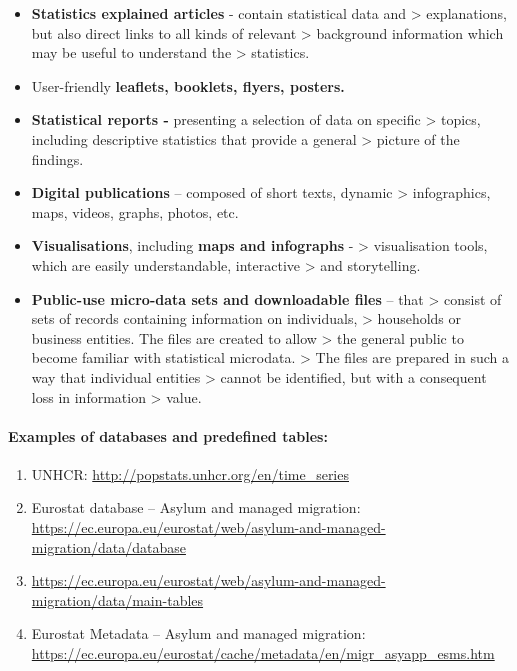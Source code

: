 \documentclass[
]{article}
\begin{document}
\begin{itemize}
\item
  \textbf{Statistics explained articles} - contain statistical data and
  \textgreater{} explanations, but also direct links to all kinds of relevant
  \textgreater{} background information which may be useful to understand the
  \textgreater{} statistics.
\item
  User-friendly \textbf{leaflets, booklets, flyers, posters.}
\item
  \textbf{Statistical reports -} presenting a selection of data on specific
  \textgreater{} topics, including descriptive statistics that provide a general
  \textgreater{} picture of the findings.
\item
  \textbf{Digital publications} -- composed of short texts, dynamic
  \textgreater{} infographics, maps, videos, graphs, photos, etc.
\item
  \textbf{Visualisations}, including \textbf{maps and infographs} -
  \textgreater{} visualisation tools, which are easily understandable, interactive
  \textgreater{} and storytelling.
\item
  \textbf{Public-use micro-data sets and downloadable files} -- that
  \textgreater{} consist of sets of records containing information on individuals,
  \textgreater{} households or business entities. The files are created to allow
  \textgreater{} the general public to become familiar with statistical microdata.
  \textgreater{} The files are prepared in such a way that individual entities
  \textgreater{} cannot be identified, but with a consequent loss in information
  \textgreater{} value.
\end{itemize}

\hypertarget{examples-of-databases-and-predefined-tables-1}{%
\paragraph{Examples of databases and predefined tables:}\label{examples-of-databases-and-predefined-tables-1}}

\begin{enumerate}
\def\labelenumi{\roman{enumi}.}
\item
  UNHCR: \url{http://popstats.unhcr.org/en/time_series}
\item
  Eurostat database -- Asylum and managed migration:
  \url{https://ec.europa.eu/eurostat/web/asylum-and-managed-migration/data/database}
\item
  \url{https://ec.europa.eu/eurostat/web/asylum-and-managed-migration/data/main-tables}
\item
  Eurostat Metadata -- Asylum and managed migration:
  \url{https://ec.europa.eu/eurostat/cache/metadata/en/migr_asyapp_esms.htm}
\end{enumerate}
\end{document}
